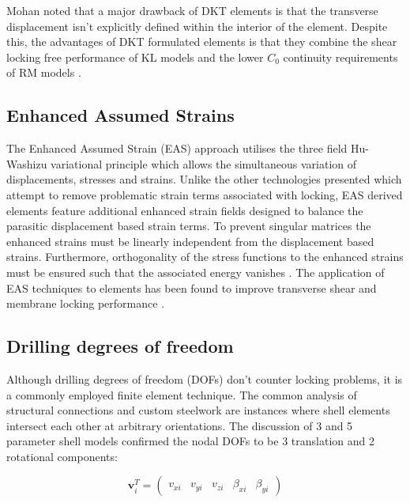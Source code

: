Mohan \cite{Mohan97} noted that a major drawback of DKT elements is that the transverse displacement isn't explicitly defined within the interior of the element. Despite this, the advantages of DKT formulated elements is that they combine the shear locking free performance of KL models and the lower $C_0$ continuity requirements of RM models \cite{Bletz16}.

\subsection{Enhanced Assumed Strains}

The Enhanced Assumed Strain (EAS) approach \cite{Simo1990} utilises the three field Hu-Washizu variational principle which allows the simultaneous variation of displacements, stresses and strains. Unlike the other technologies presented which attempt to remove problematic strain terms associated with locking, EAS derived elements feature additional enhanced strain fields designed to balance the parasitic displacement based strain terms. To prevent singular matrices the enhanced strains must be linearly independent from the displacement based strains. Furthermore, orthogonality of the stress functions to the enhanced strains must be ensured such that the associated energy vanishes \cite{Echter13}. The application of EAS techniques to elements has been found to improve transverse shear and membrane locking performance \cite{Simo1990} \cite{BischLitBook04} \cite{Echter13}.

\subsection{Drilling degrees of freedom} \label{drilling_DOF_section}

Although drilling degrees of freedom (DOFs) don't counter locking problems, it is a commonly employed finite element technique. The common analysis of structural connections and custom steelwork are instances where shell elements intersect each other at arbitrary orientations. The discussion of 3 and 5 parameter shell models confirmed the nodal DOFs to be 3 translation and 2 rotational components:

\begin{equation} 
\mathbf{v}_i^T = \begin{pmatrix}
v_{xi} & v_{yi} & v_{zi} & \beta_{xi} & \beta_{yi}
\end{pmatrix}
\label{eqsdrilling}
\end{equation}

